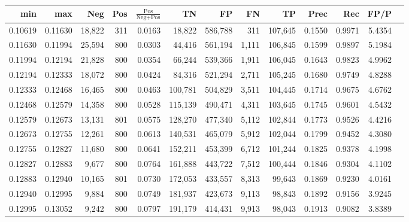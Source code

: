 \begin{tabular}{rrrrrrrrrrrrr}
\toprule
    min &     max &    Neg &   Pos & $\frac{\text{Pos}}{\text{Neg}+\text{Pos}}$ &      TN &      FP &      FN &      TP &   Prec &    Rec &   FP/P \\
\midrule
0.10619 & 0.11630 & 18,822 &   311 &                                     0.0163 &  18,822 & 586,788 &     311 & 107,645 & 0.1550 & 0.9971 & 5.4354 \\
0.11630 & 0.11994 & 25,594 &   800 &                                     0.0303 &  44,416 & 561,194 &   1,111 & 106,845 & 0.1599 & 0.9897 & 5.1984 \\
0.11994 & 0.12194 & 21,828 &   800 &                                     0.0354 &  66,244 & 539,366 &   1,911 & 106,045 & 0.1643 & 0.9823 & 4.9962 \\
0.12194 & 0.12333 & 18,072 &   800 &                                     0.0424 &  84,316 & 521,294 &   2,711 & 105,245 & 0.1680 & 0.9749 & 4.8288 \\
0.12333 & 0.12468 & 16,465 &   800 &                                     0.0463 & 100,781 & 504,829 &   3,511 & 104,445 & 0.1714 & 0.9675 & 4.6762 \\
0.12468 & 0.12579 & 14,358 &   800 &                                     0.0528 & 115,139 & 490,471 &   4,311 & 103,645 & 0.1745 & 0.9601 & 4.5432 \\
0.12579 & 0.12673 & 13,131 &   801 &                                     0.0575 & 128,270 & 477,340 &   5,112 & 102,844 & 0.1773 & 0.9526 & 4.4216 \\
0.12673 & 0.12755 & 12,261 &   800 &                                     0.0613 & 140,531 & 465,079 &   5,912 & 102,044 & 0.1799 & 0.9452 & 4.3080 \\
0.12755 & 0.12827 & 11,680 &   800 &                                     0.0641 & 152,211 & 453,399 &   6,712 & 101,244 & 0.1825 & 0.9378 & 4.1998 \\
0.12827 & 0.12883 &  9,677 &   800 &                                     0.0764 & 161,888 & 443,722 &   7,512 & 100,444 & 0.1846 & 0.9304 & 4.1102 \\
0.12883 & 0.12940 & 10,165 &   801 &                                     0.0730 & 172,053 & 433,557 &   8,313 &  99,643 & 0.1869 & 0.9230 & 4.0161 \\
0.12940 & 0.12995 &  9,884 &   800 &                                     0.0749 & 181,937 & 423,673 &   9,113 &  98,843 & 0.1892 & 0.9156 & 3.9245 \\
0.12995 & 0.13052 &  9,242 &   800 &                                     0.0797 & 191,179 & 414,431 &   9,913 &  98,043 & 0.1913 & 0.9082 & 3.8389 \\

\end{tabular}

